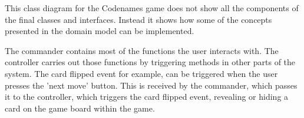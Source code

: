 \documentclass[10pt, a4paper]{article}
\begin{document}
			This class diagram for the Codenames game does not show all the components of the final classes and interfaces. Instead it shows how some of the concepts presented in the domain model can be implemented.  
			
			The commander contains most of the functions the user interacts with. The controller carries out those functions by triggering methods in other parts of the system. The card flipped event for example, can  be triggered when the user presses the 'next move' button. This is received by the commander, which passes it to the controller, which triggers the card flipped event, revealing or hiding a card on the game board within the game. 
			
			
			\pagebreak 

			
	
\end{document}
